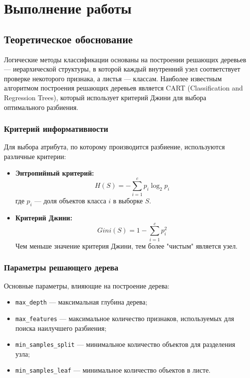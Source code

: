 \chapter{Выполнение работы}
\label{ch:chapter_lab4}

\section{Теоретическое обоснование}

Логические методы классификации основаны на построении решающих деревьев — иерархической структуры, в которой каждый внутренний узел соответствует проверке некоторого признака, а листья — классам. Наиболее известным алгоритмом построения решающих деревьев является CART (Classification and Regression Trees), который использует критерий Джини для выбора оптимального разбиения.

\subsection{Критерий информативности}

Для выбора атрибута, по которому производится разбиение, используются различные критерии:

\begin{itemize}
    \item \textbf{Энтропийный критерий:} 
    \[
    H(S) = -\sum_{i=1}^{c} p_i \log_2 p_i
    \]
    где \(p_i\) — доля объектов класса \(i\) в выборке \(S\).

    \item \textbf{Критерий Джини:}
    \[
    Gini(S) = 1 - \sum_{i=1}^{c} p_i^2
    \]
    Чем меньше значение критерия Джини, тем более "чистым" является узел.
\end{itemize}

\subsection{Параметры решающего дерева}

Основные параметры, влияющие на построение дерева:
\begin{itemize}
    \item \texttt{max\_depth} — максимальная глубина дерева;
    \item \texttt{max\_features} — максимальное количество признаков, используемых для поиска наилучшего разбиения;
    \item \texttt{min\_samples\_split} — минимальное количество объектов для разделения узла;
    \item \texttt{min\_samples\_leaf} — минимальное количество объектов в листе.
\end{itemize}

